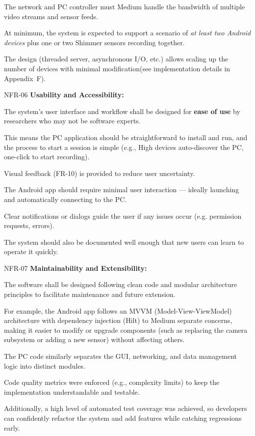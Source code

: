 The network and PC controller must Medium handle the bandwidth of multiple video
streams and sensor feeds.

At minimum, the system is expected to support a scenario of \textit{at least two
Android devices} plus one or two Shimmer sensors recording together.

The design (threaded server, asynchronous I/O, etc.) allows scaling up the number of
devices with minimal modification(see implementation details in Appendix~F).

NFR-06 \textbf{Usability and Accessibility:}

The system's user interface and workflow shall be designed for \textbf{ease of use}
 by researchers who may not be software experts.

This means the PC application should be straightforward to install and run, and the
process to start a session is simple (e.g., High devices auto-discover the PC,
one-click to start recording).

Visual feedback (FR-10) is provided to reduce user uncertainty.

The Android app should require minimal user interaction --- ideally launching and
automatically connecting to the PC.

Clear notifications or dialogs guide the user if any issues occur (e.g.  permission
requests, errors).

The system should also be documented well enough that new users can learn to operate
it quickly.

NFR-07 \textbf{Maintainability and Extensibility:}

The software shall be designed following clean code and modular architecture
principles to facilitate maintenance and future extension.

For example, the Android app follows an MVVM (Model-View-ViewModel) architecture with
dependency injection (Hilt) to Medium separate concerns, making it easier to modify
or upgrade components (such as replacing the camera subsystem or adding a new sensor)
without affecting others.

The PC code similarly separates the GUI, networking, and data management logic into
distinct modules.

Code quality metrics were enforced (e.g., complexity limits) to keep the
implementation understandable and testable.

Additionally, a high level of automated test coverage was achieved, so developers can
confidently refactor the system and add features while catching regressions early.

